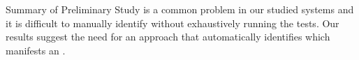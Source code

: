 \begin{Summary}{Summary of Preliminary Study}{}
\inconsistent is a common problem in our studied systems and it is difficult to manually identify \inconsistent without exhaustively running the tests. Our results suggest the need for an approach that automatically identifies which \instance manifests an \inconsistent. 
\end{Summary}


